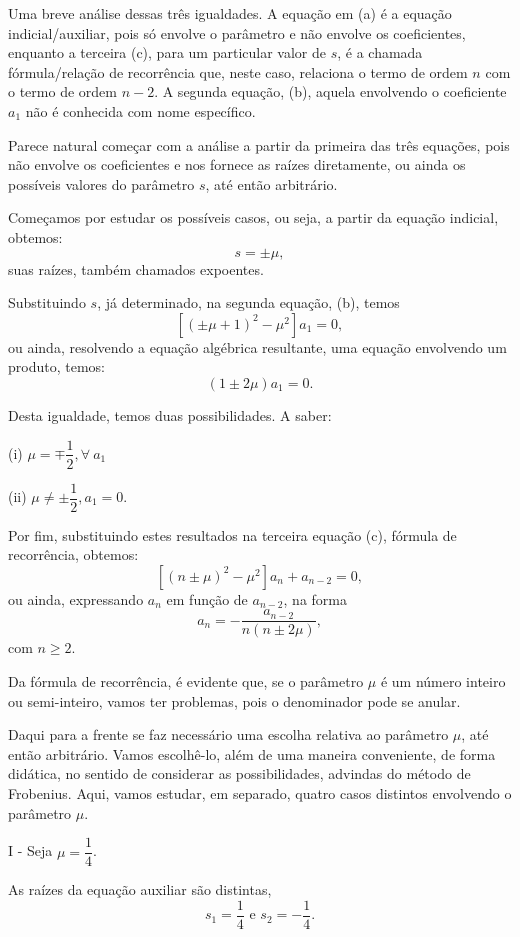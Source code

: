 {Uma breve análise dessas três igualdades. A equação em (a) é a equação indicial/auxiliar, pois só envolve o parâmetro e não envolve os coeficientes, enquanto a terceira (c), para um particular valor de $s$, é a chamada fórmula/relação de recorrência que, neste caso, relaciona o termo de ordem $n$ com o termo de ordem $n - 2$. A segunda equação, (b), aquela envolvendo o coeficiente $a_{1}$ não é conhecida com nome específico.

Parece natural começar com a análise a partir da primeira das três equações, pois não envolve os coeficientes e nos fornece as raízes diretamente, ou ainda os possíveis valores do parâmetro $s$, até então arbitrário.

Começamos por estudar os possíveis casos, ou seja, a partir da equação indicial, obtemos:
$$s = \pm\mu,$$
suas raízes, também chamados expoentes.

Substituindo $s$, já determinado, na segunda equação, (b), temos $$[(\pm\mu + 1)^2 - \mu^2] a_{1} = 0,$$
ou ainda, resolvendo a equação algébrica resultante, uma equação envolvendo um produto, temos:
$$(1 \pm 2\mu) a_{1} = 0.$$

Desta igualdade, temos duas possibilidades. A saber:
\begin{description}
\item (i) $\mu = \mp \dfrac{1}{2}, \forall\ a_1$
\item (ii) $\mu \ne \pm \dfrac{1}{2}, a_{1} = 0$.
\end{description}

Por fim, substituindo estes resultados na terceira equação (c), fórmula de recorrência, obtemos:
$$[(n \pm \mu)^2 - \mu^2] a_n + a_{n-2} = 0,$$
ou ainda, expressando $a_n$ em função de $a_{n-2}$, na forma
$$a_n = -\dfrac{a_{n-2}}{n(n \pm 2\mu)},$$
com $n \ge 2$.

Da fórmula de recorrência, é evidente que, se o parâmetro $\mu$ é um número inteiro ou semi-inteiro, vamos ter problemas, pois o denominador pode se anular.

Daqui para a frente se faz necessário uma escolha relativa ao parâmetro $\mu$, até então arbitrário. Vamos escolhê-lo, além de uma maneira conveniente, de forma didática, no sentido de considerar as possibilidades, advindas do método de Frobenius. Aqui, vamos estudar, em separado, quatro casos distintos envolvendo o parâmetro $\mu$.


I - Seja $\mu = \dfrac{1}{4}$.

As raízes da equação auxiliar são distintas,
$$s_1 = \dfrac{1}{4} \mbox{ e } s_{2} = -\dfrac{1}{4}.$$

}
